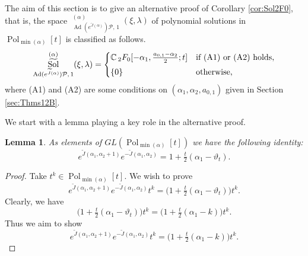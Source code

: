 \documentclass[a4paper,11pt,reqno]{amsart}
\newcommand{\CC}{\mathbb{C}}
\newcommand{\calP}{\mathcal{P}}
\newcommand{\0}{{\bf 0}}
\newcommand{\1}{{\bf 1}}
\DeclareMathOperator{\Ad}{Ad}
\DeclareMathOperator{\Pol}{Pol}
\DeclareMathOperator{\Sol}{Sol}
\newcommand{\wJ}{\widetilde{J}}
\DeclareMathOperator{\wSol}{\widetilde{\Sol}}
\theoremstyle{plain}
\newtheorem{lemma}[equation]{Lemma}
\theoremstyle{definition}
\numberwithin{equation}{section}
\theoremstyle{definition}
\begin{document}
\begin{appendices}
The aim of this section is to give an alternative proof of Corollary \ref{cor:Sol2F0},
that is, the space
$\wSol_{\Ad(e^{\wJ(\alpha)}) \calP,\, 1}^{(\alpha)}(\xi,\lambda)$
of polynomial solutions
in $\Pol_{\min(\alpha)}[t]$ 
is classified as follows.
\begin{equation}\label{eqn:CorSol}
\wSol_{\Ad(e^{\wJ(\alpha)}) \calP,\, 1}^{(\alpha)}(\xi,\lambda)
=
\begin{cases}
\CC\, 
{}_2F_0[-\alpha_1,\tfrac{a_{0,1}-\alpha_2}{2};t]
& 
\textnormal{if (A1) or (A2) holds,}\\[3pt]
\{0\} & \textnormal{otherwise,}
\end{cases}
\end{equation}
where (A1) and (A2) are some conditions on 
 $(\alpha_1, \alpha_2, a_{0,1})$ given in Section \ref{sec:Thms12B}.

We start with a lemma playing a key role in the alternative proof.

\begin{lemma}\label{lem:eDD}
As elements of $GL(\Pol_{\min(\alpha)}[t])$ we have the following identity:
\begin{equation*}
e^{\tilde{J}(\alpha_1,\alpha_2+1)}e^{-\tilde{J}(\alpha_1,\alpha_2)}=1+\tfrac{t}{2}(\alpha_1-\vartheta_t).
\end{equation*}
\end{lemma}

\begin{proof}
Take $t^k \in \Pol_{\min(\alpha)}[t]$. We wish to prove
\begin{equation*}
e^{\tilde{J}(\alpha_1,\alpha_2+1)}e^{-\tilde{J}(\alpha_1,\alpha_2)}t^k
=\big(1+\tfrac{t}{2}(\alpha_1-\vartheta_t)\big)t^k.
\end{equation*}
Clearly, we have 
\begin{equation*}
\big(1+\tfrac{t}{2}(\alpha_1-\vartheta_t)\big)t^k 
= \big(1+\tfrac{t}{2}(\alpha_1- k)\big)t^k.
\end{equation*}
Thus we aim to show
\begin{equation*}
e^{\tilde{J}(\alpha_1,\alpha_2+1)}e^{-\tilde{J}(\alpha_1,\alpha_2)}t^k
= \big(1+\tfrac{t}{2}(\alpha_1- k)\big)t^k.
\end{equation*}


\end{proof}
\end{appendices}
\end{document}
